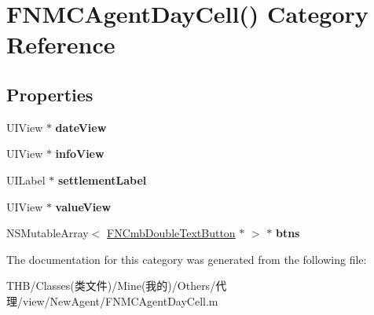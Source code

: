 \hypertarget{category_f_n_m_c_agent_day_cell_07_08}{}\section{F\+N\+M\+C\+Agent\+Day\+Cell() Category Reference}
\label{category_f_n_m_c_agent_day_cell_07_08}
\subsection*{Properties}
\begin{DoxyCompactItemize}
\item 
\mbox{\label{category_f_n_m_c_agent_day_cell_07_08_a17f45c8927019d49dc3e38f6cff02edc}} 
U\+I\+View $\ast$ {\bfseries date\+View}
\item 
\mbox{\label{category_f_n_m_c_agent_day_cell_07_08_a9178b5aca940ea0d2b00366c68f5c9a3}} 
U\+I\+View $\ast$ {\bfseries info\+View}
\item 
\mbox{\label{category_f_n_m_c_agent_day_cell_07_08_a6b18ab8aa8a27daacb1e92b3c76cd535}} 
U\+I\+Label $\ast$ {\bfseries settlement\+Label}
\item 
\mbox{\label{category_f_n_m_c_agent_day_cell_07_08_a712046bfa15e9d2769e69adeea789c9a}} 
U\+I\+View $\ast$ {\bfseries value\+View}
\item 
\mbox{\label{category_f_n_m_c_agent_day_cell_07_08_a148c9c85ae93b0a163c7e79bf1c50e6c}} 
N\+S\+Mutable\+Array$<$ \mbox{\hyperlink{interface_f_n_cmb_double_text_button}{F\+N\+Cmb\+Double\+Text\+Button}} $\ast$ $>$ $\ast$ {\bfseries btns}
\end{DoxyCompactItemize}


The documentation for this category was generated from the following file\+:\begin{DoxyCompactItemize}
\item 
T\+H\+B/\+Classes(类文件)/\+Mine(我的)/\+Others/代理/view/\+New\+Agent/F\+N\+M\+C\+Agent\+Day\+Cell.\+m\end{DoxyCompactItemize}
